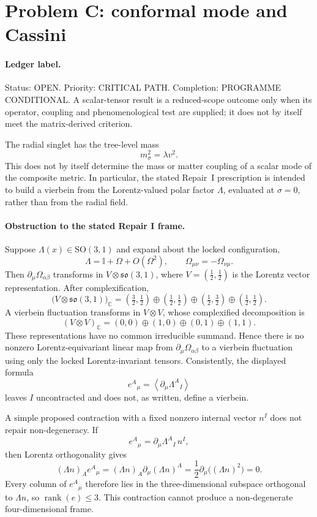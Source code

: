 \section{Problem C: conformal mode and Cassini}
\label{sec:status-C}

\paragraph{Ledger label.}
Status: OPEN. Priority: CRITICAL PATH. Completion:
PROGRAMME CONDITIONAL. A scalar-tensor result is a reduced-scope
outcome only when its operator, coupling and phenomenological test
are supplied; it does not by itself meet the matrix-derived criterion.

The radial singlet has the tree-level mass
\[
m_\sigma^2=\lambda v^2.
\]
This does not by itself determine the mass or matter coupling of a
scalar mode of the composite metric. In particular, the stated
Repair~I prescription is intended to build a vierbein from the Lorentz-valued
polar factor \(\Lambda\), evaluated at \(\sigma=0\), rather than from
the radial field.

\paragraph{Obstruction to the stated Repair I frame.}
Suppose \(\Lambda(x)\in\mathrm{SO}(3,1)\) and expand about the locked
configuration,
\[
\Lambda=\mathbb I+\Omega+O(\Omega^2),
\qquad
\Omega_{\mu\nu}=-\Omega_{\nu\mu}.
\]
Then \(\partial_\mu\Omega_{\alpha\beta}\) transforms in
\(V\otimes\mathfrak{so}(3,1)\), where \(V=(\tfrac12,\tfrac12)\)
is the Lorentz vector representation. After complexification,
\[
\bigl(V\otimes\mathfrak{so}(3,1)\bigr)_{\mathbb C}
=
\left(\tfrac32,\tfrac12\right)
\oplus\left(\tfrac12,\tfrac12\right)
\oplus\left(\tfrac12,\tfrac32\right)
\oplus\left(\tfrac12,\tfrac12\right).
\]
A vierbein fluctuation transforms in \(V\otimes V\), whose
complexified decomposition is
\[
(V\otimes V)_{\mathbb C}
=
(0,0)\oplus(1,0)\oplus(0,1)\oplus(1,1).
\]
These representations have no common irreducible summand. Hence
there is no nonzero Lorentz-equivariant linear map from
\(\partial_\mu\Omega_{\alpha\beta}\) to a vierbein fluctuation using
only the locked Lorentz-invariant tensors. Consistently, the displayed
formula
\[
e^A{}_\mu=\left\langle\partial_\mu\Lambda^A{}_I\right\rangle
\]
leaves \(I\) uncontracted and does not, as written, define a vierbein.

A simple proposed contraction with a fixed nonzero internal vector
\(n^I\) does not repair non-degeneracy. If
\[
e^A{}_\mu=\partial_\mu\Lambda^A{}_I\,n^I,
\]
then Lorentz orthogonality gives
\[
(\Lambda n)_A e^A{}_\mu
=
(\Lambda n)_A\partial_\mu(\Lambda n)^A
=
\frac12\partial_\mu\bigl((\Lambda n)^2\bigr)
=0.
\]
Every column of \(e^A{}_\mu\) therefore lies in the
three-dimensional subspace orthogonal to \(\Lambda n\), so
\(\operatorname{rank}(e)\leq 3\). This contraction cannot produce a
non-degenerate four-dimensional frame.

